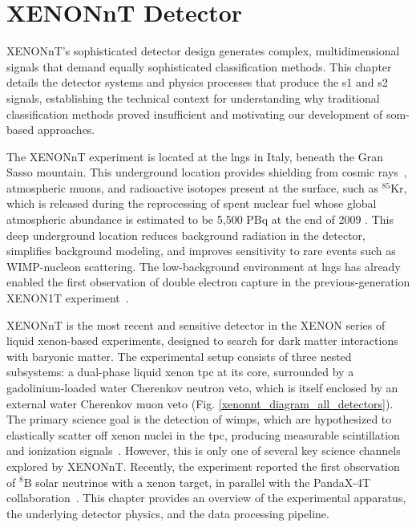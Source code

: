 \section{XENONnT Detector}


XENONnT's sophisticated detector design generates complex, multidimensional signals that demand equally
sophisticated classification methods. This chapter details the detector systems and physics processes that
produce the \acrfull{s1} and \acrfull{s2} signals, establishing the technical context for understanding why traditional
classification methods proved insufficient and motivating our development of \acrfull{som}-based approaches.

The XENONnT experiment is located at the \acrfull{lngs} in Italy, beneath the Gran Sasso mountain. This underground location provides shielding from cosmic rays~\cite{PDG2024CosmicRays}, atmospheric muons, and radioactive isotopes present at the surface, such as $^{85}$Kr, which is released during the reprocessing of spent nuclear fuel whose global atmospheric abundance is estimated to be 5,500 PBq at the end of 2009 \cite{AHLSWEDE201334}. This deep underground location reduces background radiation in the detector, simplifies background modeling, and improves sensitivity to rare events such as WIMP-nucleon scattering. The low-background environment at \gls{lngs} has already enabled the first observation of double electron capture in the previous-generation XENON1T experiment~\cite{doubleEcapture}.

XENONnT is the most recent and sensitive detector in the XENON series of liquid xenon-based experiments, designed to search for dark matter interactions with baryonic matter. The experimental setup consists of three nested subsystems: a dual-phase liquid xenon \gls{tpc} at its core, surrounded by a gadolinium-loaded water Cherenkov neutron veto, which is itself enclosed by an external water Cherenkov muon veto (Fig. \ref{xenonnt_diagram_all_detectors}). The primary science goal is the detection of \glspl{wimp}, which are hypothesized to elastically scatter off xenon nuclei in the \gls{tpc}, producing measurable scintillation and ionization signals~\cite{PhysRevLett.131.041003}. However, this is only one of several key science channels explored by XENONnT. Recently, the experiment reported the first observation of $^8$B solar neutrinos with a xenon target, in parallel with the PandaX-4T collaboration~\cite{XENON:2024ijk, PhysRevLett.133.191001}. This chapter provides an overview of the experimental apparatus, the underlying detector physics, and the data processing pipeline.

